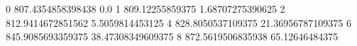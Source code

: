 0 807.4354858398438 0.0
1 809.12255859375 1.68707275390625
2 812.9414672851562 5.5059814453125
4 828.8050537109375 21.36956787109375
6 845.9085693359375 38.47308349609375
8 872.5619506835938 65.12646484375
